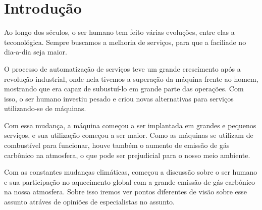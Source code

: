 \section{Introdução}

Ao longo dos séculos, o ser humano tem feito várias evoluções, entre
elas a teconológica. Sempre buscamos a melhoria de serviços, para que
a faciliade no dia-a-dia seja maior.

O processo de automatização de serviços teve um grande crescimento após
a revolução industrial, onde nela tivemos a superação da máquina frente
ao homem, mostrando que era capaz de subustuí-lo em grande parte das
operações. Com isso, o ser humano investiu pesado e criou novas alternativas
para serviços utilizando-se de máquinas.

Com essa mudança, a máquina começou a ser implantada em grandes e pequenos
serviços, e sua utilização começou a ser maior. Como as máquinas se utilizam
de combustível para funcionar, houve também o aumento de emissão de gás
carbônico na atmosfera, o que pode ser prejudicial para o nosso meio
ambiente.

Com as constantes mudanças climáticas, começou a discussão sobre o ser
humano e sua participação no aquecimento global com a grande emissão de gás
carbônico na nossa atmosfera. Sobre isso iremos ver pontos diferentes de
visão sobre esse assunto atráves de opiniões de especialistas no assunto.
